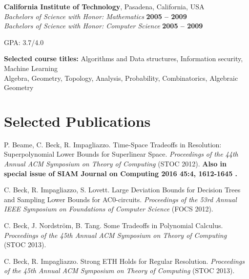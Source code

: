 \documentclass[margin,line]{resume}
\begin{document}
\begin{resume}
    \textbf{California Institute of Technology}, Pasadena, California, USA \vspace{2mm}\\\vspace{1mm}%
    \textsl{Bachelors of Science with Honor: Mathematics} \hfill \textbf{ 2005 -- 2009}\\
    \textsl{Bachelors of Science with Honor: Computer Science} \hfill \textbf{ 2005 -- 2009}\vspace{-3mm}\\%
    \begin{list2}
	\item GPA: 3.7/4.0
    \end{list2}

    \textbf{Selected course titles:} Algorithms and Data structures, Information security, Machine Learning \\
    Algebra, Geometry, Topology, Analysis, Probability, Combinatorics, Algebraic Geometry \\

    \section{\mysidestyle Selected Publications}

    P. Beame, C. Beck, R. Impagliazzo. Time-Space Tradeoffs in Resolution: Superpolynomial Lower Bounds for Superlinear Space. \textsl{Proceedings of the 44th Annual ACM Symposium on Theory of Computing } (STOC 2012). {\bf Also in special issue of SIAM Journal on Computing 2016 45:4, 1612-1645 .}

\vspace{-2mm}
    C. Beck, R. Impagliazzo, S. Lovett. Large Deviation Bounds for Decision Trees and Sampling Lower Bounds for AC0-circuits. \textsl{Proceedings of the 53rd Annual IEEE Symposium on Foundations of Computer Science} (FOCS 2012). 

\vspace{-2mm}
    C. Beck, J. Nordstr{\"o}m, B. Tang. Some Tradeoffs in Polynomial Calculus. 
    \textsl{Proceedings of the 45th Annual ACM Symposium on Theory of Computing } (STOC 2013).
    

\vspace{-2mm}
    C. Beck, R. Impagliazzo. Strong ETH Holds for Regular Resolution.
    \textsl{Proceedings of the 45th Annual ACM Symposium on Theory of Computing } (STOC 2013).


\end{resume}
\end{document}
